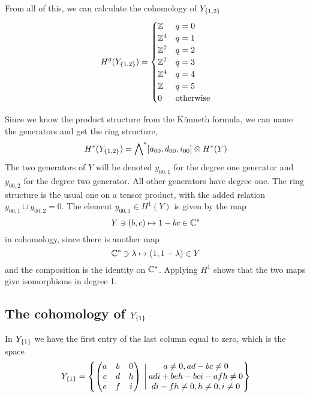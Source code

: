 From all of this, we can calculate the cohomology of $Y_{\left\{ 1,2 \right\}}$
\[ H^q(Y_{\left\{ 1,2 \right\}}) =
\begin{cases}
  \mathbb{Z} & q = 0 \\
  \mathbb{Z}^4 & q = 1 \\
  \mathbb{Z}^7 & q = 2 \\
  \mathbb{Z}^7 & q = 3 \\
  \mathbb{Z}^4 & q = 4 \\
  \mathbb{Z} & q = 5 \\
  0 & \text{otherwise}
\end{cases} \]

Since we know the product structure from the K\"unneth formula, we can
name the generators and get the ring structure,
\[ H^*(Y_{\left\{ 1,2 \right\}}) = \bigwedge\nolimits^*[a_{00},d_{00},i_{00}]\otimes
H^*(Y) \]
The two generators of $Y$ will be denoted $y_{00,1}$ for the degree
one generator and $y_{00,2}$ for the degree two generator. All other
generators have degree one. The ring
structure is the usual one on a tensor product, with the added
relation $y_{00,1}\cup y_{00,2} = 0$. The element $y_{00,1}\in H^1(Y)$
is given by the map
\[ Y\ni (b,c) \mapsto 1-bc\in \mathbb{C}^* \]
in cohomology, since there is another map
\[ \mathbb{C}^* \ni \lambda \mapsto (1,1-\lambda) \in Y \]
and the composition is the identity on $\mathbb{C}^*$. Applying $H^1$ shows
that the two maps give isomorphisms in degree 1.


\subsection{The cohomology of $Y_{\left\{ 1 \right\}}$}

In $Y_{\left\{ 1 \right\}}$ we have the first entry of the last column equal to
zero, which is the space
\[ Y_{\left\{ 1 \right\}} = \left\{ 
  \begin{pmatrix}
    a & b & 0 \\
    c & d & h \\
    e & f & i
  \end{pmatrix} \:\Bigg\vert\:
  \begin{matrix}
    a \neq 0, ad-bc \neq 0 \\
    adi + beh - bci - afh \neq 0 \\
    di -fh \neq 0, h \neq 0, i \neq 0 
  \end{matrix}
 \right\} \]

